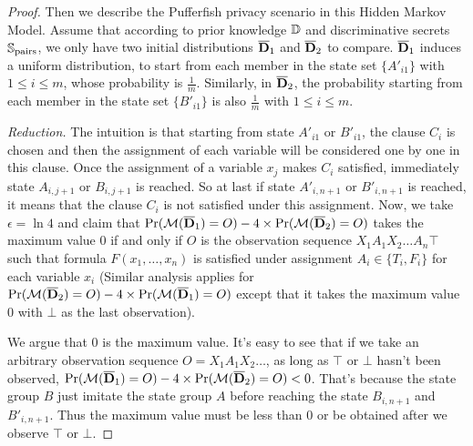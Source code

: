 \begin{proof}
  Then we describe the Pufferfish privacy scenario in this Hidden Markov Model. Assume that according to
  prior knowledge $\mathbb{D}$ and discriminative secrets $\mathbb{S}_{\textmd{pairs}}$, we only have
  two initial distributions $\overline{\mathbf{D}}_1$ and $\overline{\mathbf{D}}_2$ to compare. $\overline{\mathbf{D}}_1$ induces a uniform distribution,
  to start from each member in the state set $\{A'_{i1}\}$ with $1 \leq i \leq m$, whose probability is $\frac{1}{m}$.
  Similarly, in $\overline{\mathbf{D}}_2$, the probability starting from each member in the state set $\{B'_{i1}\}$ is also $\frac{1}{m}$ with $1 \leq i \leq m$.

  \textit{Reduction.} The intuition is that starting from state $A'_{i1}$ or $B'_{i1}$,
  the clause $C_i$ is chosen and then the assignment of each variable will be considered one by one
  in this clause. Once the assignment of a variable $x_j$ makes $C_i$ satisfied, immediately
  state $A_{i,j+1}$ or $B_{i,j+1}$ is reached. So at last if state $A'_{i,n+1}$ or $B'_{i,n+1}$
  is reached, it means that the clause $C_i$ is not satisfied under this assignment. Now, we take $\epsilon = \ln 4$
  and claim that  $\Pr (\mathcal{M} (\overline{\mathbf{D}}_1) = O) - 4 \times \Pr (\mathcal{M} (\overline{\mathbf{D}}_2) = O)$ takes the maximum value $0$
  if and only if $O$ is the observation sequence $X_1A_1X_2\ldots A_n \top$ such that
  formula $F(x_1,\ldots,x_n)$ is satisfied under assignment $A_i \in \{T_i,F_i\}$ for each variable $x_i$
  (Similar analysis applies for $\Pr (\mathcal{M} (\overline{\mathbf{D}}_2) = O) - 4 \times \Pr (\mathcal{M} (\overline{\mathbf{D}}_1) = O)$ except that it takes the
   maximum value $0$ with $\bot$ as the last observation).

  We argue that $0$ is the maximum value.
  It's easy to see that if we take an arbitrary observation sequence $O = X_1A_1X_2\ldots $,
  as long as $\top$ or $\bot$ hasn't been observed, $\Pr (\mathcal{M} (\overline{\mathbf{D}}_1) = O) -  4 \times \Pr (\mathcal{M} (\overline{\mathbf{D}}_2) = O) < 0$.
  That's because the state group $B$ just imitate the state group $A$ before reaching the state
  $B_{i,n+1}$ and $B'_{i,n+1}$. Thus the maximum value must be less than 0 or be obtained after we observe $\top$
  or $\bot$.


\end{proof}
